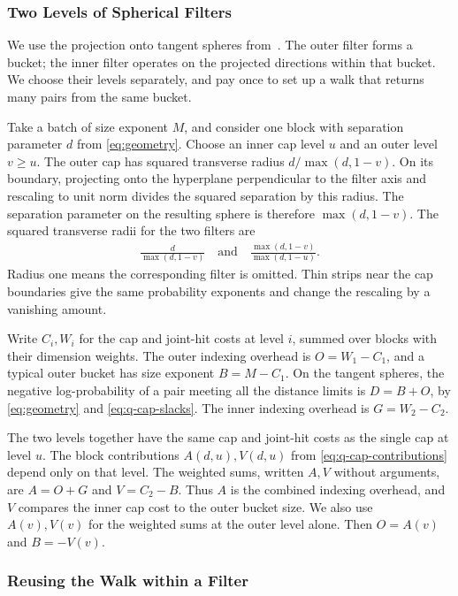 \documentclass[runningheads,envcountsame,envcountsect,orivec]{llncs}
\begin{document}
\subsubsection{Two Levels of Spherical Filters}


We use the projection onto tangent spheres from~\cite{CL21}.
The outer filter forms a bucket; the inner filter operates on
the projected directions within that bucket. We choose
their levels separately, and pay once to set up a walk that
returns many pairs from the same bucket.

Take a batch of size exponent $M$, and consider one block with
separation parameter $d$ from \eqref{eq:geometry}. Choose an
inner cap level $u$ and an outer level $v\ge u$. The outer cap
has squared transverse radius $d/\max(d,1-v)$.
On its boundary, projecting onto the hyperplane perpendicular to
the filter axis and rescaling to unit norm divides the squared
separation by this radius. The separation parameter on the
resulting sphere is therefore $\max(d,1-v)$. The squared
transverse radii for the two filters are
\begin{align}
 \frac{d}{\max(d,1-v)}
 \quad\text{and}\quad
 \frac{\max(d,1-v)}{\max(d,1-u)} .
 \label{eq:q-cap-slacks}
\end{align}
Radius one means the corresponding filter is omitted. Thin
strips near the cap boundaries give the same probability
exponents and change the rescaling by a vanishing amount.

Write $C_i,W_i$ for the cap and joint-hit costs at level $i$,
summed over blocks with their dimension weights. The outer
indexing overhead is $O=W_1-C_1$, and a typical outer bucket
has size exponent $B=M-C_1$. On the tangent spheres, the
negative log-probability of a pair meeting all the distance
limits is $D=B+O$, by \eqref{eq:geometry} and
\eqref{eq:q-cap-slacks}. The inner indexing overhead is $G=W_2-C_2$.

The two levels together have the same cap and joint-hit costs
as the single cap at level $u$. The block contributions
$A(d,u),V(d,u)$ from \eqref{eq:q-cap-contributions}
depend only on that level.
The weighted sums, written $A,V$ without arguments, are
$A=O+G$ and $V=C_2-B$. Thus $A$ is the combined indexing
overhead, and $V$ compares the inner cap cost to the outer
bucket size. We also use $A(v),V(v)$ for the weighted sums
at the outer level alone. Then $O=A(v)$ and $B=-V(v)$.

\subsubsection{Reusing the Walk within a Filter}
\end{document}
